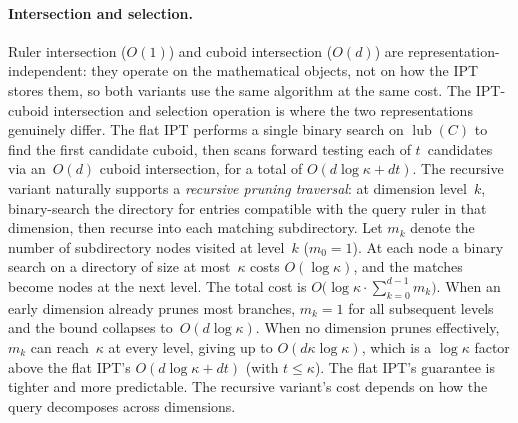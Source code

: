 \documentclass[manuscript,screen,review]{acmart}
\theoremstyle{definition}
\theoremstyle{plain}
\begin{document}
\paragraph{Intersection and selection.}
Ruler intersection ($O(1)$) and cuboid intersection ($O(d)$) are
representation-independent: they operate on the mathematical objects,
not on how the IPT stores them, so both variants use the same algorithm
at the same cost.
The IPT-cuboid intersection and selection operation
is where the two representations genuinely differ.
The flat IPT performs a single binary search on $\operatorname{lub}(C)$
to find the first candidate cuboid, then scans forward testing each of
$t$~candidates via an~$O(d)$ cuboid intersection, for a total of
$O(d\log\kappa+dt)$.
The recursive variant naturally supports a \emph{recursive pruning
traversal}: at dimension level~$k$, binary-search the directory for
entries compatible with the query ruler in that dimension, then recurse
into each matching subdirectory.
Let $m_k$ denote the number of subdirectory nodes visited at level~$k$
($m_0=1$). At each node a binary search on a directory of size
at most~$\kappa$ costs $O(\log\kappa)$, and the matches become nodes
at the next level.
The total cost is
$O\!\bigl(\log\kappa\cdot\sum_{k=0}^{d-1}m_k\bigr)$.
When an early dimension already prunes most branches,
$m_k=1$ for all subsequent levels and the bound collapses
to~$O(d\log\kappa)$.
When no dimension prunes effectively, $m_k$ can reach~$\kappa$
at every level, giving up to $O(d\kappa\log\kappa)$,
which is a $\log\kappa$ factor above the flat IPT's
$O(d\log\kappa+dt)$ (with $t\le\kappa$).
The flat IPT's guarantee is tighter and more predictable.
The recursive variant's cost depends on how the query
decomposes across dimensions.
\end{document}
